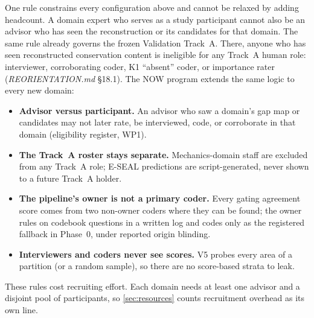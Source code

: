 One rule constrains every configuration above and cannot be relaxed by adding headcount. A domain
expert who serves as a study participant cannot also be an advisor who has seen the
reconstruction or its candidates for that domain. The same rule already governs the frozen
Validation Track~A. There, anyone who has seen reconstructed conservation content is ineligible
for any Track~A human role: interviewer, corroborating coder, K1 \enquote{absent} coder, or
importance rater (\emph{REORIENTATION.md} \S18.1). The NOW program extends the same logic to every
new domain:

\begin{itemize}[noitemsep]
  \item \textbf{Advisor versus participant.} An advisor who saw a domain's gap map or candidates
    may not later rate, be interviewed, code, or corroborate in that domain (eligibility register,
    WP1).
  \item \textbf{The Track~A roster stays separate.} Mechanics-domain staff are excluded from any
    Track~A role; E-SEAL predictions are script-generated, never shown to a future Track~A holder.
  \item \textbf{The pipeline's owner is not a primary coder.} Every gating agreement score comes from
    two non-owner coders where they can be found; the owner rules on codebook questions in a written
    log and codes only as the registered fallback in Phase~0, under reported origin blinding.
  \item \textbf{Interviewers and coders never see scores.} V5 probes every area of a partition (or a
    random sample), so there are no score-based strata to leak.
\end{itemize}

\evint{} These rules cost recruiting effort. Each domain needs at least one advisor and a disjoint
pool of participants, so \cref{sec:resources} counts recruitment overhead as its own line.
